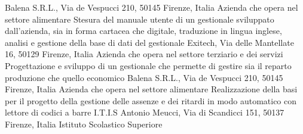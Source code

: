 \documentclass[totpages,openbib,italian]{europecv}
\begin{document}
\begin{europecv}
{Balena S.R.L., Via de Vespucci 210, 50145 Firenze, Italia}
{Azienda che opera nel settore alimentare} 
{Stesura del manuale utente di un gestionale sviluppato dall'azienda,
  sia in forma cartacea che digitale, traduzione in lingua inglese,
  analisi e gestione della base di dati del gestionale}
{Exitech, Via delle Mantellate 16, 50129 Firenze, Italia}
{Azienda che opera nel settore terziario e dei servizi} 
{Progettazione e sviluppo di un gestionale che permette di gestire sia
  il reparto produzione che quello economico}
{Balena S.R.L., Via de Vespucci 210, 50145 Firenze, Italia}
{Azienda che opera nel settore alimentare} 
{Realizzazione della basi per il progetto della gestione delle assenze
  e dei ritardi in modo automatico con lettore di codici a barre}
{I.T.I.S Antonio Meucci, Via di Scandicci 151, 50137 Firenze, Italia}
{Istituto Scolastico Superiore}



\end{europecv}
\end{document}
